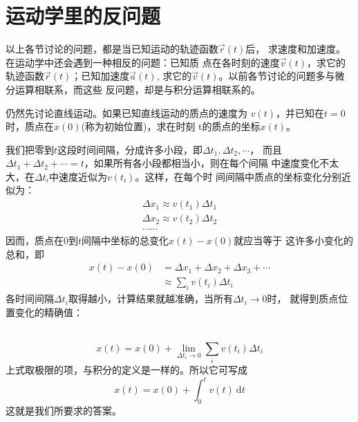 \section{运动学里的反问题}\label{sec:01.11}

以上各节讨论的问题，都是当已知运动的轨迹函数$\vec{r}\left(t\right)$后，
求速度和加速度。在运动学中还会遇到一种相反的问题：已知质
点在各时刻的速度$\vec{v}\left(t\right)$，求它的轨迹函数$\vec{r}\left(t\right)$；已知加速度$\vec{a}\left(t\right)$,
求它的$\vec{v}\left(t\right)$。以前各节讨论的问题多与微分运算相联系，而这些
反问题，却是与积分运算相联系的。

仍然先讨论直线运动。如果已知直线运动的质点的速度为
$v\left(t\right)$，并已知在$t=0$时，质点在$x\left(0\right)$(称为初始位置)，求在时刻
t的质点的坐标$x\left(t\right)$。

我们把零到$t$这段时间间隔，分成许多小段，即$\Delta t_1 , \Delta t_2 , \cdots$，
而且$\Delta t_1+\Delta t_2+\cdots=t$，如果所有各小段都相当小，则在每个间隔
中速度变化不太大，在$\Delta t_i$中速度近似为$v\left(t_i\right)$。这样，在每个时
间间隔中质点的坐标变化分别近似为：
\begin{equation*}
 \begin{array}{l}
 \Delta x_{1} \approx v\left(t_{1}\right) \Delta t_{1} \\[-1pt]
 \Delta x_{2} \approx v\left(t_{2}\right) \Delta t_{2} \\[-1pt]
 \cdots \cdots
 \end{array}
\end{equation*}
因而，质点在0到$t$间隔中坐标的总变化$x\left(t\right)-x\left(0\right)$就应当等于
这许多小变化的总和，即\vspace{-0.5em}
\begin{equation}\label{eqn:01.11.01}
 \begin{aligned}
 x\left(t\right)-x\left(0\right) & =\Delta x_{1}+\Delta x_{2}+\Delta x_{3}+\cdots \\[-1pt]
 & \approx \sum_{i} v\left(t_{i}\right) \Delta t_{i}
 \end{aligned}
\end{equation}
各时间间隔$\Delta t_i$取得越小，计算结果就越准确，当所有$\Delta t_i\rightarrow 0$时，
就得到质点位置变化的精确值：

~\vspace{-1.56em}
\begin{equation}\label{eqn:01.11.02}
 x\left(t\right)=x\left(0\right)+\lim _{\Delta t_{i} \rightarrow 0} \sum_{i} v\left(t_{i}\right) \Delta t_{i}
\end{equation}
上式取极限的项，与积分的定义是一样的。所以它可写成
\begin{equation}\label{eqn:01.11.03}
 x\left(t\right)=x\left(0\right)+\int_{0}^{t} v\left(t\right) {~\mathrm d} t
\end{equation}
这就是我们所要求的答案。

